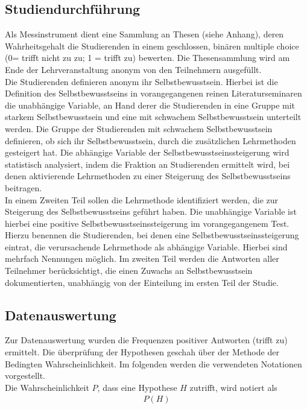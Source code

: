 \subsection{Studiendurchführung}
Als Messinstrument dient eine Sammlung an Thesen (siehe Anhang), deren Wahrheitsgehalt die Studierenden in einem geschlossen, binären multiple choice (0= trifft nicht zu zu; 1 = trifft zu) bewerten. Die Thesensammlung wird am Ende der Lehrveranstaltung anonym von den Teilnehmern ausgefüllt.\\
\noindent
Die Studierenden definieren anonym ihr Selbstbewusstsein. Hierbei ist die Definition des Selbstbewusstseins in vorangegangenen reinen Literaturseminaren die unabhängige Variable, an Hand derer die Studierenden in eine Gruppe mit starkem Selbstbewusstsein und eine mit schwachem Selbstbewusstsein unterteilt werden. Die Gruppe der Studierenden mit schwachem Selbstbewusstsein definieren, ob sich ihr Selbstbewusstsein, durch die zusätzlichen Lehrmethoden gesteigert hat. Die abhängige Variable der Selbstbewusstseinssteigerung wird statistisch analysiert, indem die Fraktion an Studierenden ermittelt wird, bei denen aktivierende Lehrmethoden zu einer Steigerung des Selbstbewusstseins beitragen.\\
\noindent
In einem Zweiten Teil sollen die Lehrmethode identifiziert werden, die zur Steigerung des Selbstbewusstseins geführt haben. Die unabhängige Variable ist hierbei eine positive Selbstbewusstseinssteigerung im vorangegangenem Test. Hierzu benennen die Studierenden, bei denen eine Selbstbewusstseinssteigerung eintrat, die verursachende Lehrmethode als abhängige Variable. Hierbei sind mehrfach Nennungen möglich. Im zweiten Teil werden die Antworten aller Teilnehmer berücksichtigt, die einen Zuwachs an Selbstbewusstsein dokumentierten, unabhängig von der Einteilung im ersten Teil der Studie.

\subsection{Datenauswertung}
Zur Datenauswertung wurden die Frequenzen positiver Antworten (trifft zu) ermittelt. Die überprüfung der Hypothesen geschah über der Methode der Bedingten Wahrscheinlichkeit. Im folgenden werden die verwendeten Notationen vorgestellt.\\
\noindent
Die Wahrscheinlichkeit $P$, dass eine Hypothese $H$ zutrifft, wird notiert als
\begin{align}
	\label{eq:Prob1}
	P(H)
\end{align}

